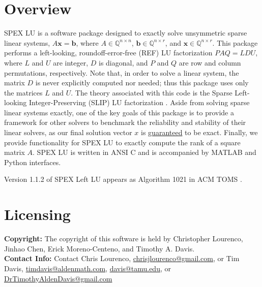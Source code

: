 \documentclass[12pt,oneside]{book}
\theoremstyle{definition}
\renewcommand{\b}{\mathbf{b}}
\newcommand{\x}{\mathbf{x}}
\begin{document}
\section{Overview} \label{s:LeftLU:intro}
SPEX LU is a software package designed to exactly solve unsymmetric sparse
linear systems, $ A \x = \b$, where $A \in \mathbb{Q}^{n \times
n}$, $\b \in \mathbb{Q}^{n \times r}$, and $\x \in \mathbb{Q}^{n \times
r}$. This package performs a left-looking, roundoff-error-free (REF) LU
factorization $P A Q = L D U$, where $L$ and $U$ are integer, $D$ is diagonal,
and $P$ and $Q$ are row and column permutations, respectively. 
Note that, in order to solve a linear system, the matrix $D$ is never explicitly computed nor needed; thus this 
package uses only the matrices $L$ and $U$. The theory associated with this code is the Sparse Left-looking Integer-Preserving (SLIP) LU factorization
 \cite{lourenco2019exact}. Aside from
solving sparse linear systems exactly, one of the key goals of this package is
to provide a framework for other solvers to benchmark the reliability and
stability of their linear solvers, as our final solution vector $x$ is
\ul{guaranteed} to be exact. Finally, we provide functionality for SPEX LU to exactly compute the rank of a square matrix $A$. SPEX LU is written in ANSI C and is accompanied by MATLAB and Python interfaces.

Version 1.1.2 of SPEX Left LU appears as Algorithm 1021 in ACM TOMS \cite{lourenco2022algorithm}.


\section{Licensing} \label{s:LeftLU:licensing}
\textbf{Copyright:} The copyright of this software is held by  Christopher Lourenco, Jinhao Chen, Erick Moreno-Centeno, and Timothy A. Davis.\\

\noindent \textbf{Contact Info:} Contact Chris Lourenco,
\href{mailto:chrisjlourenco@gmail.com}{chrisjlourenco@gmail.com}, or Tim Davis,
\href{mailto:timdavis@aldenmath.com}{timdavis@aldenmath.com},
\href{mailto:davis@tamu.edu}{davis@tamu.edu}, or
\href{mailto:DrTimothyAldenDavis@gmail.com}{DrTimothyAldenDavis@gmail.com}\\
\end{document}
